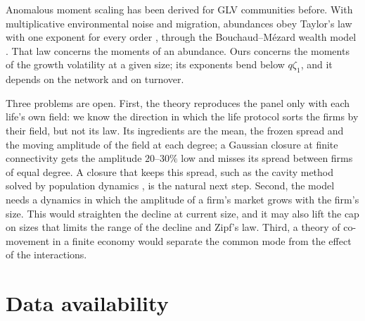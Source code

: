 \documentclass[pre,twocolumn,superscriptaddress,nofootinbib]{revtex4-2}
\begin{document}
Anomalous moment scaling has been derived for GLV communities before.  With multiplicative environmental noise
and migration, abundances obey Taylor's law with one exponent for every order \cite{alhiyasat2026}, through the
Bouchaud--M\'ezard wealth model \cite{bouchaudmezard2000}.  That law concerns the moments of an abundance.  Ours
concerns the moments of the growth volatility at a given size; its exponents bend below $q\zeta_1$, and it
depends on the network and on turnover.

Three problems are open.  First, the theory reproduces the panel only with each life's own field: we know the
direction in which the life protocol sorts the firms by their field, but not its law.  Its ingredients are the
mean, the frozen spread and the moving amplitude of the field at each degree; a Gaussian closure at finite
connectivity gets the amplitude $20$--$30\%$ low and misses its spread between firms of equal degree.  A closure that keeps this spread, such as the cavity method solved by population dynamics \cite{tarabolo2025,tonolo2025}, is the
natural next step.  Second, the model needs a dynamics in which the amplitude of a firm's market grows with the
firm's size.  This would straighten the decline at current size, and it may also lift the cap on sizes that limits
the range of the decline and Zipf's law.  Third, a theory
of co-movement in a finite economy would separate the common mode from the effect of the interactions.

\section*{Data availability}
\end{document}
